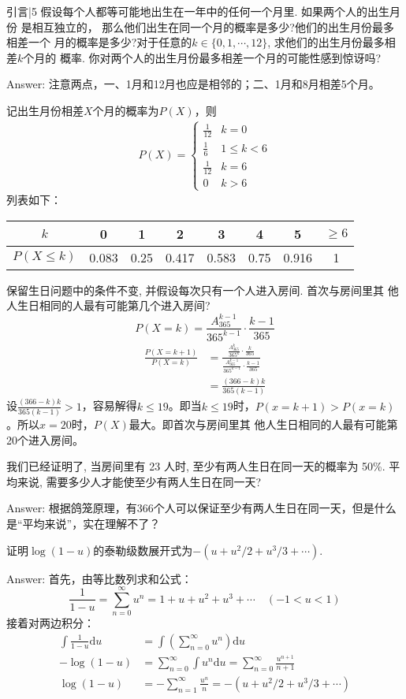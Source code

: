 \newChapter 引言|5
\exer 假设每个人都等可能地出生在一年中的任何一个月里. 如果两个人的出生月份 是相互独立的， 那么他们出生在同一个月的概率是多少?他们的出生月份最多相差一个 月的概率是多少?对于任意的$k\in\{0, 1,\cdots , 12\}$, 求他们的出生月份最多相差$k$个月的 概率. 你对两个人的出生月份最多相差一个月的可能性感到惊讶吗?\par
Answer: 注意两点，一、1月和12月也应是相邻的；二、1月和8月相差5个月。\par
记出生月份相差$X$个月的概率为$P(X)$，则
\begin{gather*}
P(X)=
\begin{cases}
\frac{1}{12} & k = 0\\
\frac{1}{6} & 1\le k < 6 \\
\frac{1}{12} & k = 6\\
0 & k > 6
\end{cases}
\end{gather*}
列表如下：
\begin{center}
\begin{tabular}{c|*{7}{c}}
$k$ & 0 & 1 & 2 & 3 & 4 & 5 & $\ge 6$ \\
\hline
$P(X\le k)$ & 0.083 & 0.25 & 0.417 & 0.583 & 0.75 & 0.916 & 1 \\
\end{tabular} 
\end{center}

\exer 保留生日问题中的条件不变, 并假设每次只有一个人进入房间. 首次与房间里其 他人生日相同的人最有可能第几个进入房间?
\[ P(X=k) = \frac{A_{365}^{k-1}}{365^{k-1}} \cdot \frac{k-1}{365} \]
\begin{align*}
    \frac{P(X=k+1)}{P(X=k)} &= \frac{\frac{A_{365}^{k}}{365^{k}} \cdot \frac{k}{365}}{\frac{A_{365}^{k-1}}{365^{k-1}} \cdot \frac{k-1}{365}} \\
    &=\frac{(366-k)k}{365(k-1)}
\end{align*}
设$\frac{(366-k)k}{365(k-1)}>1$，容易解得$k\le 19$。即当$k\le 19$时，$P(x=k+1) > P(x=k)$。所以$x=20$时，$P(X)$最大。即首次与房间里其 他人生日相同的人最有可能第20个进入房间。

\exer 我们已经证明了, 当房间里有 23 人时, 至少有两人生日在同一天的概率为 50\%. 平均来说, 需要多少人才能使至少有两人生日在同一天?\par
Answer: 根据鸽笼原理，有366个人可以保证至少有两人生日在同一天，但是什么是``平均来说''，实在理解不了？

\exer 证明$\log(1−u)$的泰勒级数展开式为$−(u+u^2/2+u^3/3+\cdots)$.\par
Answer: 首先，由等比数列求和公式：
\[\frac{1}{1-u} = \sum_{n=0}^\infty u^n = 1+ u + u^2 + u^3 + \cdots\quad (-1<u<1)\]
接着对两边积分：
\begin{align*}
\int\frac{1}{1-u}\mathrm{d}u &= \int\left(\sum_{n=0}^\infty u^n\right) \mathrm{d}u \\
-\log(1-u)&=\sum_{n=0}^\infty \int u^n\mathrm{d}u = \sum_{n=0}^\infty \frac{u^{n+1}}{n+1} \\
\log(1-u)&=-\sum_{n=1}^\infty \frac{u^n}{n} = -(u+u^2/2 + u^3/3+\cdots)
\end{align*}


